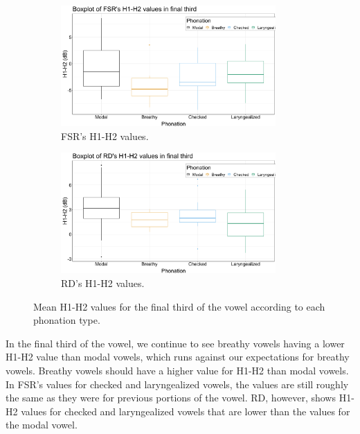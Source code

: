 \documentclass[12pt, letterpaper]{article}
\begin{document}
\begin{figure}[!ht]
	\centering
	\begin{subfigure}{.5\textwidth}
		\centering
		\includegraphics[width=0.9\textwidth]{../mean_FSR_h1h2_3rd.png}
		\caption{FSR's H1-H2 values.}
		\label{fig:FSRh1h2third} 
	\end{subfigure}%
	\begin{subfigure}{.5\textwidth}
		\centering
		\includegraphics[width=0.9\textwidth]{../mean_RD_h1h2_3rd.png}
		\caption{RD's H1-H2 values.}
		\label{fig:RDh1h2third} 
	\end{subfigure}
	\caption{Mean H1-H2 values for the final third of the vowel according to each phonation type. }
	\label{fig:h1h2third}
\end{figure}

In the final third of the vowel, we continue to see breathy vowels having a lower H1-H2 value than modal vowels, which runs against our expectations for breathy vowels. Breathy vowels should have a higher value for H1-H2 than modal vowels. In FSR's values for checked and laryngealized vowels, the values are still roughly the same as they were for previous portions of the vowel. RD, however, shows H1-H2 values for checked and laryngealized vowels that are lower than the values for the modal vowel. 
\end{document}
